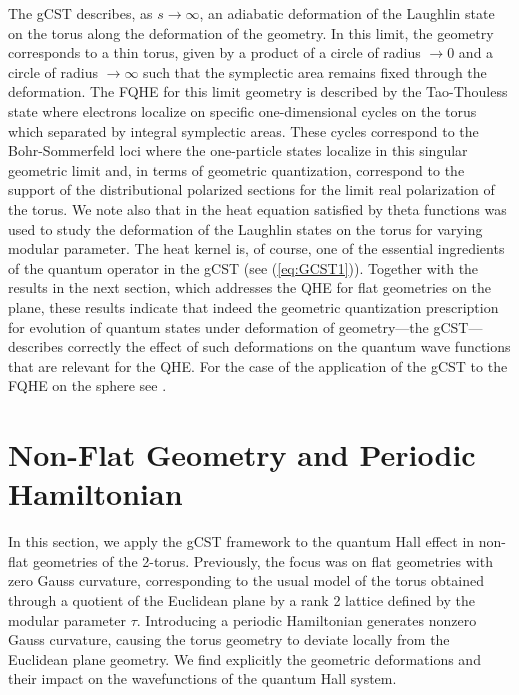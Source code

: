 \documentclass[a4paper,11pt]{article}
\begin{document}
The gCST describes, as $s\to\infty$,  an adiabatic deformation of the Laughlin state on the torus along the deformation of the geometry. In this limit,  the geometry corresponds to a thin torus, given by a product of a circle of radius $\to 0$ and a circle of radius $\to \infty$ such that the symplectic area remains fixed through the deformation. The FQHE for this limit geometry is described by the Tao-Thouless state \cite{PhysRevB.77.155308, hansson2009taothoulessrevisited} where electrons localize on specific one-dimensional cycles on the torus which separated by integral symplectic areas. These cycles correspond to the Bohr-Sommerfeld loci where the one-particle states localize in this singular geometric limit and, in terms of geometric quantization, correspond to the support of the distributional polarized sections for the limit real polarization of the torus. We note also that in \cite{Zhou_Nussinov_Seidel} the heat equation satisfied by theta functions was used to study the deformation of the Laughlin states on the torus for varying modular parameter. The heat kernel is, of course, one of the essential ingredients of the quantum operator in the gCST 
(see (\ref{eq:GCST1})). Together with the results in the next section, which addresses the QHE for 
flat geometries on the plane, these results indicate that indeed the geometric quantization prescription for evolution of quantum states under deformation of geometry---the gCST---describes correctly the effect of such deformations on the quantum wave functions that are relevant for the QHE. For the case of the application of the gCST to the FQHE on the sphere see \cite{matos:mera:mourao:mourao:nunes:2023}.





\section{Non-Flat Geometry and Periodic Hamiltonian}
\label{sec:non_flat_geometry}

In this section, we apply the gCST framework to the quantum Hall effect in non-flat geometries of the 2-torus. Previously, the focus was on flat geometries with zero Gauss curvature, corresponding  to the usual model of the torus obtained through a quotient of the  Euclidean plane by a rank 2 lattice defined by the modular parameter $\tau$. Introducing a periodic Hamiltonian generates nonzero Gauss curvature, causing the torus geometry to deviate locally from the Euclidean plane geometry. We find explicitly the  geometric deformations and their impact on the wavefunctions of the quantum Hall system. 
\end{document}
